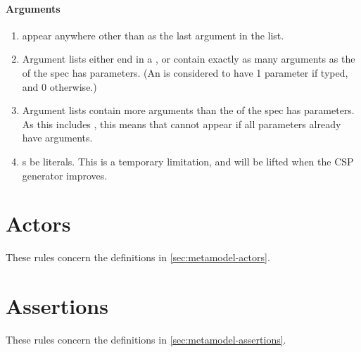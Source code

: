 \paragraph{Arguments}

\begin{enumerate}
\item
	\mrestargument{} \rfcmustnot{} appear anywhere other than as the last
	argument in the list.
\item
	Argument lists \rfcmust{} either end in a \mrestargument, or
	contain exactly as many arguments as the \mmessagetopic{} of the spec
	has parameters.  (An \meventtopic{} is considered to have 1 parameter
	if typed, and 0 otherwise.)
\item
	Argument lists \rfcmustnot{} contain more
	arguments than the \mmessagetopic{} of the spec has parameters.
	As this includes \mrestargument, this means that \mrestargument{} cannot
	appear if all parameters already have arguments.
\item
	\mexpressionargument s \rfcshould{} be literals.  This is a temporary
	limitation, and will be lifted when the CSP generator improves.
\end{enumerate}

\section{Actors}\label{sec:wf-actors}

These rules concern the definitions in \cref{sec:metamodel-actors}.

\section{Assertions}\label{sec:wf-assertions}

These rules concern the definitions in \cref{sec:metamodel-assertions}.
